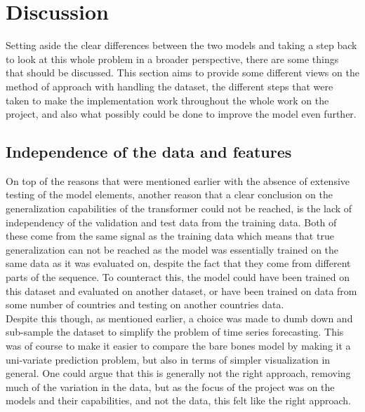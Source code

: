 \documentclass[main.tex]{subfiles}
\begin{document}
\section{Discussion}
Setting aside the clear differences between the two models and taking a step back to look at this whole problem in a broader perspective, there are some things that should be discussed. This section aims to provide some different views on the method of approach with handling the dataset, the different steps that were taken to make the implementation work throughout the whole work on the project, and also what possibly could be done to improve the model even further.

\subsection{Independence of the data and features}
On top of the reasons that were mentioned earlier with the absence of extensive testing of the model elements, another reason that a clear conclusion on the generalization capabilities of the transformer could not be reached, is the lack of independency of the validation and test data from the training data. Both of these come from the same signal as the training data which means that true generalization can not be reached as the model was essentially trained on the same data as it was evaluated on, despite the fact that they come from different parts of the sequence. To counteract this, the model could have been trained on this dataset and evaluated on another dataset, or have been trained on data from some number of countries and testing on another countries data.\\
Despite this though, as mentioned earlier, a choice was made to dumb down and sub-sample the dataset to simplify the problem of time series forecasting. This was of course to make it easier to compare the bare bones model by making it a uni-variate prediction problem, but also in terms of simpler visualization in general. One could argue that this is generally not the right approach, removing much of the variation in the data, but as the focus of the project was on the models and their capabilities, and not the data, this felt like the right approach.\\
\end{document}
